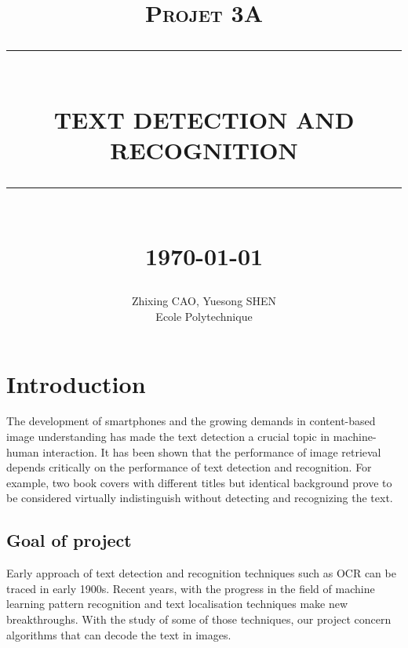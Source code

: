 \documentclass[paper=a4, french, 11pt]{scrartcl}
\newcommand{\HRule}[1]{\rule{\linewidth}{#1}}
\begin{document}
\title{ \normalsize \textsc{Projet 3A}
        \\ [2.0cm]
        \HRule{0.5pt} \\
        \LARGE \textbf{\uppercase{Text detection and recognition}}
        \HRule{2pt} \\ [0.5cm]
        \normalsize \today \vspace*{5\baselineskip}}

\date{}

\author{
        Zhixing CAO, Yuesong SHEN \\
        Ecole Polytechnique }

\maketitle
\newpage
\tableofcontents
\newpage

\sectionfont{\scshape}



\section{Introduction}
The development of smartphones and the growing demands in content-based image understanding has made the text detection a crucial topic in machine-human interaction. It has been shown that the performance of image retrieval depends critically on the performance of text detection and recognition. For example, two book covers with different titles but identical background prove to be considered virtually indistinguish without detecting and recognizing the text.

\subsection{Goal of project}
Early approach of text detection and recognition techniques such as OCR can be traced in early 1900s. Recent years, with the progress in the field of machine learning pattern recognition and text localisation techniques make new breakthroughs. With the study of some of those techniques, our project concern algorithms that can decode the text in images.
\end{document}

